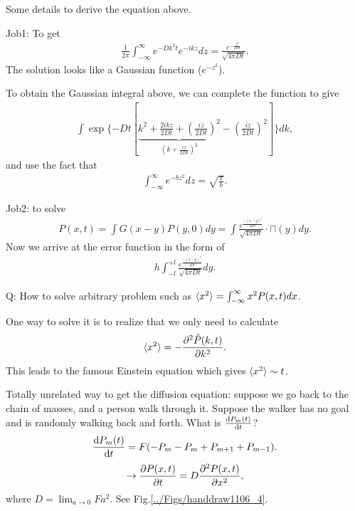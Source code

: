 Some details to derive the equation above. 

Job1: To get 
\begin{align}
\frac{1}{2\pi} \int_{-\infty}^{\infty} e^{-Dk^2 t } e^{-ikz} dz = \frac{e^{-\frac{z^2}{4Dt}}}{\sqrt{4\pi Dt}}.
\end{align}
The solution looks like a Gaussian function ($ e^{-z^2} $). 

To obtain the Gaussian integral above, we can complete the function to give
\begin{align}
\int \exp\{-Dt[\underbrace{k^2 + \frac{2ikz}{2Dt} + (\frac{iz}{2Dt})^2}_{ (k+ \frac{iz}{2Dt})^2 } - (\frac{iz}{2Dt})^2 ] \} dk,
\end{align}
and use the fact that 
\begin{align}
\int _{-\infty}^\infty e^{-bz^2} dz = \sqrt{\frac{\pi}{b}}.
\end{align}

Job2: to solve 
\begin{align}
P(x,t) = \int G(x-y) P(y,0) dy = \int \frac{e^{\frac{-(x-y)^2}{4 Dt }}}{\sqrt{4 \pi Dt}} \cdot \sqcap(y) dy.
\end{align}
Now we arrive at the error function in the form of
\begin{align}
h \int _{-l} ^{+l} \frac{e^{\frac{-(x-y)^2}{4 Dt }}}{\sqrt{4 \pi Dt}} dy.
\end{align}

Q: How to solve arbitrary problem such as $ \mathinner{\langle{x^2}\rangle}= \int_{-\infty}^\infty x^2 P(x,t)dx $. 

One way to solve it is to realize that we only need to calculate
\begin{align}
\mathinner{\langle{x^2}\rangle}=-\frac{\partial^2 {\hat{P}(k,t)}}{\partial {k}^2}. 
\end{align}
This leads to the famous Einstein equation which gives $ \mathinner{\langle{x^2}\rangle}\sim t $. 

Totally unrelated way to get the diffusion equation: 
suppose we go back to the chain of masses, and a person walk through it. Suppose the walker has no goal and is randomly walking back and forth. What is $ \frac{{\mathrm d} {P_m (t)}}{{\mathrm d}t} $? 
\begin{align}
\frac{{\mathrm d} {P_m(t)}}{{\mathrm d}t} = F(-P_m -P_m + P_{m+1}+ P_{m-1}).
\end{align}
\begin{align}
\rightarrow \frac{\partial {P(x,t)}}{\partial t} = D \frac{\partial^2 {P(x,t)}}{\partial {x}^2}, \label{eq:walkereq}
\end{align}
where $ D=\lim_{a\rightarrow 0} Fa^2$. See Fig.\ref{../Figs/handdraw1106_4}.

